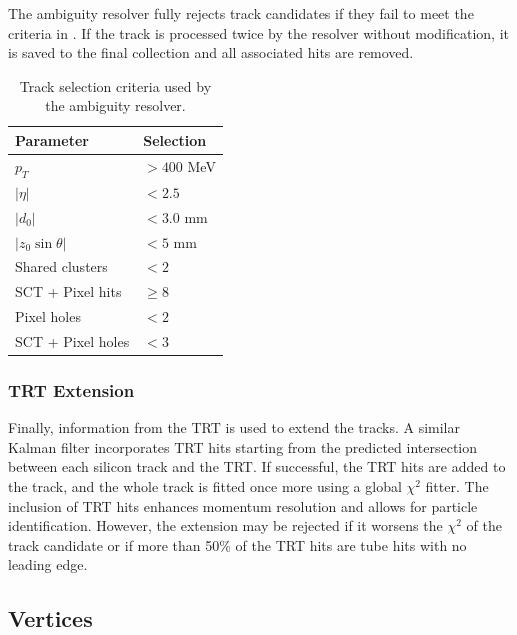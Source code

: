 The ambiguity resolver fully rejects track candidates if they fail to meet the criteria in .
If the track is processed twice by the resolver without modification, it is saved to the final collection and all associated hits are removed.

\begin{table}[h!]
    \centering
    \begin{tabular}{ll}
        \toprule
        Parameter           & Selection   \\
        \midrule
        $p_T$               & $> 400$ MeV \\
        $|\eta|$            & $< 2.5$     \\
        $|d_0|$             & $< 3.0$ mm  \\
        $|z_0 \sin \theta|$ & $< 5$ mm    \\
        Shared clusters     & $< 2$       \\
        SCT + Pixel hits    & $\geq 8$    \\
        Pixel holes         & $< 2$       \\
        SCT + Pixel holes   & $< 3$       \\
        \bottomrule
    \end{tabular}
    \caption{Track selection criteria used by the ambiguity resolver.}
    \label{tab:track_criteria}
\end{table}

\subsubsection{TRT Extension}

Finally, information from the \Gls{TRT} is used to extend the tracks.
A similar Kalman filter incorporates \Gls{TRT} hits starting from the predicted intersection between each silicon track and the \Gls{TRT}.
If successful, the \Gls{TRT} hits are added to the track, and the whole track is fitted once more using a global $\chi^2$ fitter.
The inclusion of \Gls{TRT} hits enhances momentum resolution and allows for particle identification.
However, the extension may be rejected if it worsens the $\chi^2$ of the track candidate or if more than 50\% of the \Gls{TRT} hits are tube hits with no leading edge.

\subsection{Vertices}

